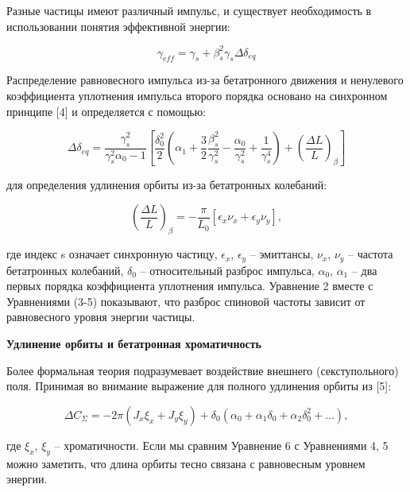\par Разные частицы имеют различный импульс, и существует необходимость в использовании понятия эффективной энергии:

\begin{equation}
\gamma_{eff}=\gamma_s+\beta_s^2\gamma_s\Delta\delta_{eq}
\end{equation}

\par Распределение равновесного импульса из-за бетатронного движения и ненулевого коэффициента уплотнения импульса второго порядка основано на синхронном принципе [4] и определяется с помощью:

\begin{equation}
\Delta\delta_{eq}=\frac{\gamma_s^2}{\gamma_s^2\alpha_0-1}\left[\frac{\delta_0^2}{2}\left(\alpha_1+\frac{3}{2}\frac{\beta_s^2}{\gamma_s^2}-\frac{\alpha_0}{\gamma_s^2}+\frac{1}{\gamma_s^4}\right)+\left(\frac{\Delta L}{L}\right)_\beta\right]
\end{equation}

\noindent для определения удлинения орбиты из-за бетатронных колебаний:

\begin{equation}
\left(\frac{\Delta L}{L}\right)_\beta=-\frac{\pi}{L_0}\left[\epsilon_x\nu_x+\epsilon_y\nu_y\right],
\end{equation}

\noindent где индекс s означает синхронную частицу, $\epsilon_x$, $\epsilon_y$ – эмиттансы, $\nu_x$, $\nu_y$ – частота бетатронных колебаний, $\delta_0$ – относительный разброс импульса, $\alpha_0$, $\alpha_1$ – два первых порядка коэффициента уплотнения импульса. Уравнение 2 вместе с Уравнениями (3-5) показывают, что разброс спиновой частоты зависит от равновесного уровня энергии частицы.

\textbf{Удлинение орбиты и бетатронная хроматичность}

\par Более формальная теория подразумевает воздействие внешнего (секступольного) поля. Принимая во внимание выражение для полного удлинения орбиты из [5]:

\begin{equation}
\Delta C_\Sigma=-2\pi\left(J_x\xi_x+J_y\xi_y\right)+\delta_0\left(\alpha_0+\alpha_1\delta_0+\alpha_2\delta_0^2+\ldots\right),
\end{equation}

где $\xi_x$, $\xi_y$ – хроматичности. Если мы сравним Уравнение 6 с Уравнениями 4, 5 можно заметить, что длина орбиты тесно связана с равновесным уровнем энергии.

